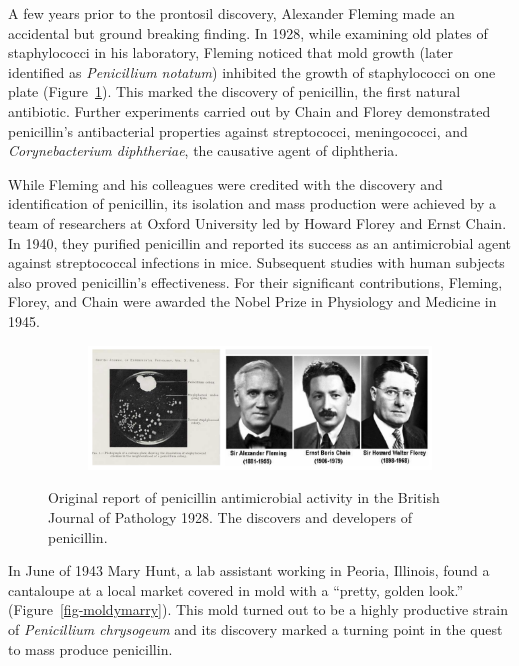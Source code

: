 \documentclass[
  letterpaper,
  DIV=11,
  numbers=noendperiod]{scrreprt}
\begin{document}
A few years prior to the prontosil discovery, Alexander Fleming made an
accidental but ground breaking finding. In 1928, while examining old
plates of staphylococci in his laboratory, Fleming noticed that mold
growth (later identified as \emph{Penicillium notatum}) inhibited the
growth of staphylococci on one plate (Figure~\ref{fig-pcndisc}). This
marked the discovery of penicillin, the first natural antibiotic.
Further experiments carried out by Chain and Florey demonstrated
penicillin's antibacterial properties against streptococci,
meningococci, and \emph{Corynebacterium diphtheriae}, the causative
agent of diphtheria.

While Fleming and his colleagues were credited with the discovery and
identification of penicillin, its isolation and mass production were
achieved by a team of researchers at Oxford University led by Howard
Florey and Ernst Chain. In 1940, they purified penicillin and reported
its success as an antimicrobial agent against streptococcal infections
in mice. Subsequent studies with human subjects also proved penicillin's
effectiveness. For their significant contributions, Fleming, Florey, and
Chain were awarded the Nobel Prize in Physiology and Medicine in 1945.

\begin{figure}

{\centering 

\begin{figure}

{\centering \includegraphics{images/pcndisc.png}

}

\end{figure}

}

\caption{\label{fig-pcndisc}Original report of penicillin antimicrobial
activity in the British Journal of Pathology 1928. The discovers and
developers of penicillin.}

\end{figure}

In June of 1943 Mary Hunt, a lab assistant working in Peoria, Illinois,
found a cantaloupe at a local market covered in mold with a ``pretty,
golden look.'' (Figure~\ref{fig-moldymarry}). This mold turned out to be
a highly productive strain of \emph{Penicillium chrysogeum} and its
discovery marked a turning point in the quest to mass produce
penicillin.
\end{document}
